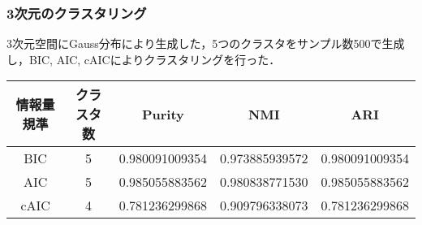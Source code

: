 \subsubsection{3次元のクラスタリング}

3次元空間にGauss分布により生成した，5つのクラスタをサンプル数500で生成し，BIC, AIC, cAICによりクラスタリングを行った．

\begin{table}[htb]
  \centering
  \begin{tabular}{|c|c|c|c|c|} \hline
  情報量規準 & クラスタ数 & Purity & NMI & ARI\\\hline
  BIC & 5 & 0.980091009354 & 0.973885939572 & 0.980091009354\\
  AIC & 5 & 0.985055883562 & 0.980838771530 & 0.985055883562\\
  cAIC & 4 & 0.781236299868 & 0.909796338073 & 0.781236299868\\\hline
  \end{tabular}
\end{table}

